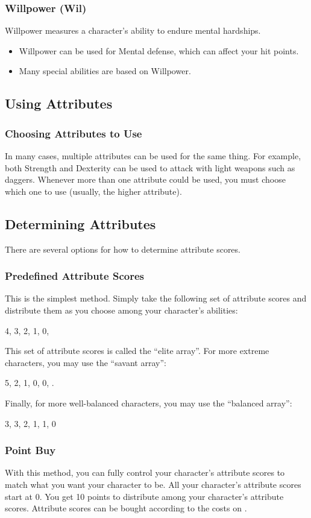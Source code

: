 \subsubsection{Willpower (Wil)}
Willpower measures a character's ability to endure mental hardships.
\begin{itemize}
    \item Willpower can be used for Mental defense, which can affect your hit points.
    \item Many special abilities are based on Willpower.
\end{itemize}

\subsection{Using Attributes}

\subsubsection{Choosing Attributes to Use}
In many cases, multiple attributes can be used for the same thing. For example, both Strength and Dexterity can be used to attack with light weapons such as daggers. Whenever more than one attribute could be used, you must choose which one to use (usually, the higher attribute).

\subsection{Determining Attributes}
There are several options for how to determine attribute scores.

\subsubsection{Predefined Attribute Scores}
This is the simplest method. Simply take the following set of attribute scores and distribute them as you choose among your character's abilities:

4, 3, 2, 1, 0, 

This set of attribute scores is called the ``elite array''. For more extreme characters, you may use the ``savant array'':

5, 2, 1, 0, 0, .

Finally, for more well-balanced characters, you may use the ``balanced array'':

3, 3, 2, 1, 1, 0

\subsubsection{Point Buy}
With this method, you can fully control your character's attribute scores to match what you want your character to be. All your character's attribute scores start at 0. You get 10 points to distribute among your character's attribute scores. Attribute scores can be bought according to the costs on .

